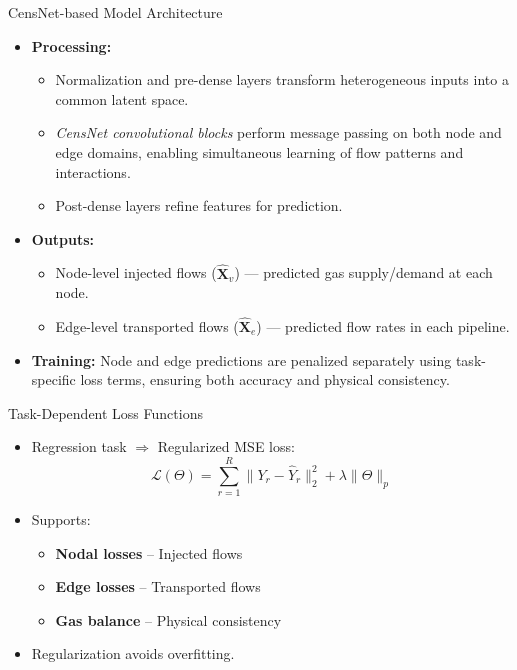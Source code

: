 \documentclass[hyperref={colorlinks,citecolor=blue,linkcolor=blue,urlcolor=blue}]{beamer}
\begin{document}
\begin{frame}{CensNet-based Model Architecture}   
\footnotesize
    \begin{itemize} 
        \item \textbf{Processing:}
        \begin{itemize}
            \item Normalization and pre-dense layers transform heterogeneous inputs into a common latent space.
            \item \emph{CensNet convolutional blocks} perform message passing on both node and edge domains, enabling simultaneous learning of flow patterns and interactions.
            \item Post-dense layers refine features for prediction.
        \end{itemize}
        
        \item \textbf{Outputs:}
        \begin{itemize}
            \item Node-level injected flows ($\hat{\mathbf{X}}_v$) — predicted gas supply/demand at each node.
            \item Edge-level transported flows ($\hat{\mathbf{X}}_e$) — predicted flow rates in each pipeline.
        \end{itemize}
        
        \item \textbf{Training:} Node and edge predictions are penalized separately using task-specific loss terms, ensuring both accuracy and physical consistency.
    \end{itemize}

\end{frame}
\begin{frame}{Task-Dependent Loss Functions}
    \begin{itemize}
        \item Regression task $\Rightarrow$ Regularized MSE loss:
        \[
            \mathcal{L}(\Theta) = \sum_{r=1}^{R} \| Y_r - \hat{Y}_r \|^2_2 + \lambda \|\Theta\|_p
        \]
        \item Supports:
        \begin{itemize}
            \item \textbf{Nodal losses} – Injected flows
            \item \textbf{Edge losses} – Transported flows
            \item \textbf{Gas balance} – Physical consistency
        \end{itemize}
        \item Regularization avoids overfitting.
    \end{itemize}
\end{frame}
\end{document}
